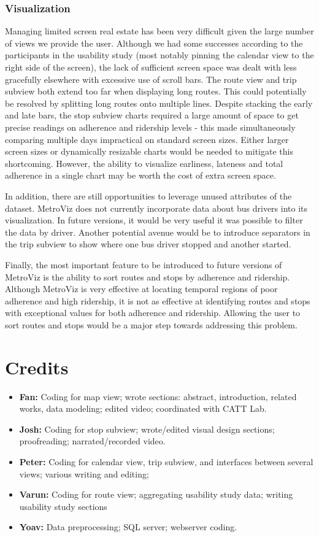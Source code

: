 \documentclass[journal]{vgtc}
\begin{document}
\subsubsection{Visualization}

Managing limited screen real estate has been very difficult given the large number of views we provide the user. Although we had some successes according to the participants in the usability study (most notably pinning the calendar view to the right side of the screen), the lack of sufficient screen space was dealt with less gracefully elsewhere with excessive use of scroll bars. The route view and trip subview both extend too far when displaying long routes. This could potentially be resolved by splitting long routes onto multiple lines. Despite stacking the early and late bars, the stop subview charts required a large amount of space to get precise readings on adherence and ridership levels - this made simultaneously comparing multiple days impractical on standard screen sizes. Either larger screen sizes or dynamically resizable charts would be needed to mitigate this shortcoming. However, the ability to visualize earliness, lateness and total adherence in a single chart may be worth the cost of extra screen space.

In addition, there are still opportunities to leverage unused attributes of the dataset. MetroViz does not currently incorporate data about bus drivers into its visualization. In future versions, it would be very useful it was possible to filter the data by driver. Another potential avenue would be to introduce separators in the trip subview to show where one bus driver stopped and another started.

Finally, the most important feature to be introduced to future versions of MetroViz is the ability to sort routes and stops by adherence and ridership. Although MetroViz is very effective at locating temporal regions of poor adherence and high ridership, it is not as effective at identifying routes and stops with exceptional values for both adherence and ridership. Allowing the user to sort routes and stops would be a major step towards addressing this problem.

\section{Credits}
\begin{itemize}
  \item \textbf{Fan:} Coding for map view; wrote sections: abstract, introduction, related works, data modeling; edited video; coordinated with CATT Lab.
  \item \textbf{Josh:} Coding for stop subview; wrote/edited visual design sections; proofreading; narrated/recorded video.
  \item \textbf{Peter:} Coding for calendar view, trip subview, and interfaces between several views; various writing and editing;
  \item \textbf{Varun:} Coding for route view; aggregating usability study data; writing usability study sections
  \item \textbf{Yoav:} Data preprocessing; SQL server; webserver coding.
\end{itemize}
\end{document}
